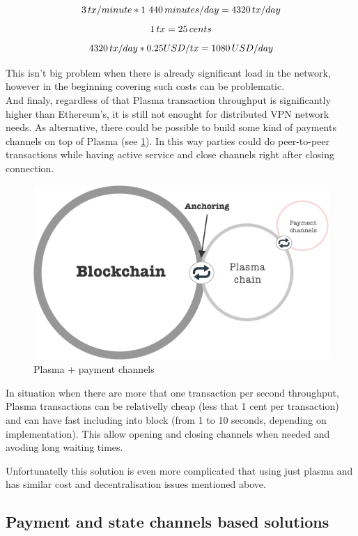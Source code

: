 \documentclass[a4paper,12pt]{article}
\begin{document}
\[ 3 \thinspace tx / minute * 1 440 \thinspace minutes / day = 4320 \thinspace tx/day \]
\[ 1 \thinspace tx = 25 \thinspace cents \]
\[ 4320 \thinspace tx/day * 0.25 USD/tx = 1080 \thinspace USD/day \]

This isn't big problem when there is already significant load in the network, 
however in the beginning covering such costs can be problematic.\\

And finaly, regardless of that Plasma transaction throughput is significantly 
higher than Ethereum's, it is still not enought for distributed VPN network 
needs. As alternative, there could be possible to build some kind of payments 
channels on top of Plasma (see \ref{img:plasma-channels}). In this way parties 
could do peer-to-peer transactions while having active service and close 
channels right after closing connection. 

\begin{figure}[H]
    \centering
    \includegraphics[scale=0.5]{../img/plasma-channels}
    \caption{Plasma + payment channels}
    \label{img:plasma-channels}
\end{figure}

In situation when there are more that one transaction per second throughput, 
Plasma transactions can be relativelly cheap (less that 1 cent per transaction)
and can have fast including into block (from 1 to 10 seconds, depending on 
implementation). This allow opening and closing channels when needed and avoding
long waiting times.

Unfortunatelly this solution is even more complicated that using just plasma and
has similar cost and decentralisation issues mentioned above.

\subsection{Payment and state channels based solutions}
\end{document}
